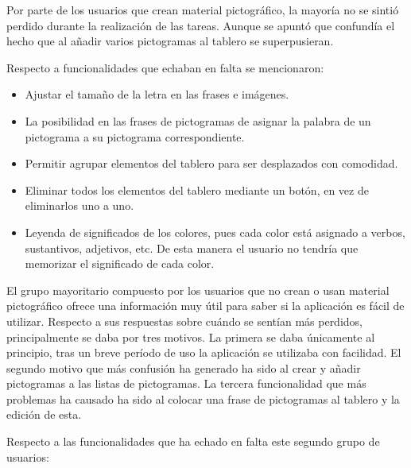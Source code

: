 Por parte de los usuarios que crean material pictográfico, la mayoría no se sintió perdido durante la realización de las tareas. Aunque se apuntó que confundía el hecho que al añadir varios pictogramas al tablero se superpusieran. 

Respecto a funcionalidades que echaban en falta se mencionaron: 
\begin{itemize}
	\item Ajustar el tamaño de la letra en las frases e imágenes. 
	\item La posibilidad en las frases de pictogramas de asignar la palabra de un pictograma a su pictograma correspondiente. 
	\item Permitir agrupar elementos del tablero para ser desplazados con comodidad.
	\item Eliminar todos los elementos del tablero mediante un botón, en vez de eliminarlos uno a uno.
	\item Leyenda de significados de los colores, pues cada color está asignado a verbos, sustantivos, adjetivos, etc. De esta manera el usuario no tendría que memorizar el significado de cada color.
\end{itemize}


El grupo mayoritario compuesto por los usuarios que no crean o usan material pictográfico ofrece una información muy útil para saber si la aplicación es fácil de utilizar. Respecto a sus respuestas sobre cuándo se sentían más perdidos, principalmente se daba por tres motivos. La primera se daba únicamente al principio, tras un breve período de uso la aplicación se utilizaba con facilidad. El segundo motivo que más confusión ha generado ha sido al crear y añadir pictogramas a las listas de pictogramas. La tercera funcionalidad que más problemas ha causado ha sido al colocar una frase de pictogramas al tablero y la edición de esta. 

Respecto a las funcionalidades que ha echado en falta este segundo grupo de usuarios:

